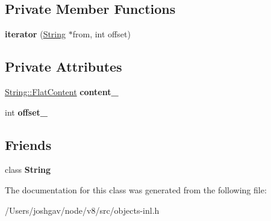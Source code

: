 \subsection*{Private Member Functions}
\begin{DoxyCompactItemize}
\item 
{\bfseries iterator} (\hyperlink{classv8_1_1internal_1_1_string}{String} $\ast$from, int offset)\hypertarget{classv8_1_1internal_1_1_string_1_1_sub_string_range_1_1iterator_a804739fa61934205d5b6795cb2b2090d}{}\label{classv8_1_1internal_1_1_string_1_1_sub_string_range_1_1iterator_a804739fa61934205d5b6795cb2b2090d}

\end{DoxyCompactItemize}
\subsection*{Private Attributes}
\begin{DoxyCompactItemize}
\item 
\hyperlink{classv8_1_1internal_1_1_string_1_1_flat_content}{String\+::\+Flat\+Content} {\bfseries content\+\_\+}\hypertarget{classv8_1_1internal_1_1_string_1_1_sub_string_range_1_1iterator_ab423154ef16a8256500fd1c2b389a1f6}{}\label{classv8_1_1internal_1_1_string_1_1_sub_string_range_1_1iterator_ab423154ef16a8256500fd1c2b389a1f6}

\item 
int {\bfseries offset\+\_\+}\hypertarget{classv8_1_1internal_1_1_string_1_1_sub_string_range_1_1iterator_af5422e601770f8c33f894a5cf5192011}{}\label{classv8_1_1internal_1_1_string_1_1_sub_string_range_1_1iterator_af5422e601770f8c33f894a5cf5192011}

\end{DoxyCompactItemize}
\subsection*{Friends}
\begin{DoxyCompactItemize}
\item 
class {\bfseries String}\hypertarget{classv8_1_1internal_1_1_string_1_1_sub_string_range_1_1iterator_a7fb804f7dc96dd9f705c84095f37f1ca}{}\label{classv8_1_1internal_1_1_string_1_1_sub_string_range_1_1iterator_a7fb804f7dc96dd9f705c84095f37f1ca}

\end{DoxyCompactItemize}


The documentation for this class was generated from the following file\+:\begin{DoxyCompactItemize}
\item 
/\+Users/joshgav/node/v8/src/objects-\/inl.\+h\end{DoxyCompactItemize}

